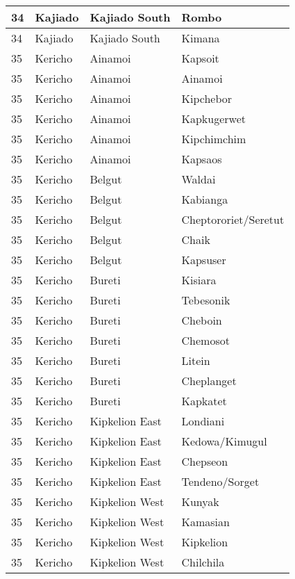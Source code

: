 \begin{table}[!ht]
\begin{tabular}{|l|l|l|l|}
        34 & Kajiado & Kajiado South & Rombo \\ \hline
        34 & Kajiado & Kajiado South & Kimana \\ \hline
        35 & Kericho & Ainamoi & Kapsoit \\ \hline
        35 & Kericho & Ainamoi & Ainamoi \\ \hline
        35 & Kericho & Ainamoi & Kipchebor \\ \hline
        35 & Kericho & Ainamoi & Kapkugerwet \\ \hline
        35 & Kericho & Ainamoi & Kipchimchim \\ \hline
        35 & Kericho & Ainamoi & Kapsaos \\ \hline
        35 & Kericho & Belgut & Waldai \\ \hline
        35 & Kericho & Belgut & Kabianga \\ \hline
        35 & Kericho & Belgut & Cheptororiet/Seretut \\ \hline
        35 & Kericho & Belgut & Chaik \\ \hline
        35 & Kericho & Belgut & Kapsuser \\ \hline
        35 & Kericho & Bureti & Kisiara \\ \hline
        35 & Kericho & Bureti & Tebesonik \\ \hline
        35 & Kericho & Bureti & Cheboin \\ \hline
        35 & Kericho & Bureti & Chemosot \\ \hline
        35 & Kericho & Bureti & Litein \\ \hline
        35 & Kericho & Bureti & Cheplanget \\ \hline
        35 & Kericho & Bureti & Kapkatet \\ \hline
        35 & Kericho & Kipkelion East & Londiani \\ \hline
        35 & Kericho & Kipkelion East & Kedowa/Kimugul \\ \hline
        35 & Kericho & Kipkelion East & Chepseon \\ \hline
        35 & Kericho & Kipkelion East & Tendeno/Sorget \\ \hline
        35 & Kericho & Kipkelion West & Kunyak \\ \hline
        35 & Kericho & Kipkelion West & Kamasian \\ \hline
        35 & Kericho & Kipkelion West & Kipkelion \\ \hline
        35 & Kericho & Kipkelion West & Chilchila \\ \hline

\end{tabular}
\end{table}
